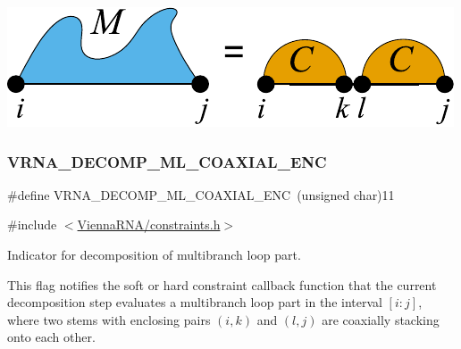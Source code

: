  
\begin{DoxyImageNoCaption}
  \mbox{\includegraphics[width=\textwidth,height=\textheight/2,keepaspectratio=true]{decomp_ml_coaxial}}
\end{DoxyImageNoCaption}
 \mbox{\label{group__constraints_ga0224727f7b8ad2f23eb0a3fd28d8b3fb}} 
\subsubsection{\texorpdfstring{V\+R\+N\+A\+\_\+\+D\+E\+C\+O\+M\+P\+\_\+\+M\+L\+\_\+\+C\+O\+A\+X\+I\+A\+L\+\_\+\+E\+NC}{VRNA\_DECOMP\_ML\_COAXIAL\_ENC}}
{\footnotesize\ttfamily \#define V\+R\+N\+A\+\_\+\+D\+E\+C\+O\+M\+P\+\_\+\+M\+L\+\_\+\+C\+O\+A\+X\+I\+A\+L\+\_\+\+E\+NC~(unsigned char)11}



{\ttfamily \#include $<$\hyperlink{constraints_8h}{Vienna\+R\+N\+A/constraints.\+h}$>$}



Indicator for decomposition of multibranch loop part. 

This flag notifies the soft or hard constraint callback function that the current decomposition step evaluates a multibranch loop part in the interval $[i:j]$, where two stems with enclosing pairs $(i,k)$ and $(l,j)$ are coaxially stacking onto each other.

